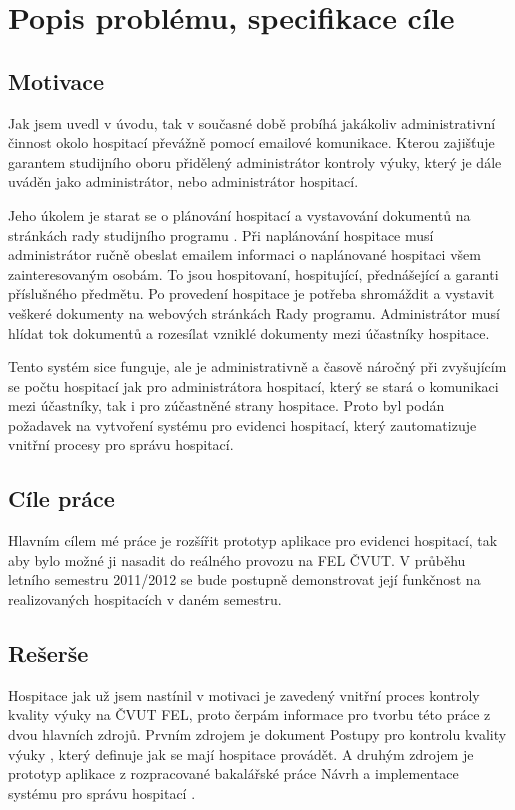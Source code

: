 \chapter{Popis problému, specifikace cíle}
\section{Motivace}
Jak jsem uvedl v úvodu, tak v současné době probíhá jakákoliv administrativní činnost okolo hospitací převážně pomocí emailové komunikace. Kterou zajišťuje garantem studijního oboru přidělený administrátor kontroly výuky, který je dále  uváděn jako administrátor, nebo administrátor hospitací. 

Jeho úkolem je starat se o plánování hospitací a vystavování dokumentů na stránkách rady studijního programu \cite{kvalitavyukyweb}. Při naplánování hospitace musí administrátor ručně obeslat emailem informaci o naplánované hospitaci všem zainteresovaným osobám. To jsou hospitovaní, hospitující, přednášející a garanti příslušného předmětu. Po provedení hospitace je potřeba shromáždit a vystavit veškeré dokumenty na webových stránkách Rady programu. Administrátor musí hlídat tok dokumentů a rozesílat vzniklé dokumenty mezi účastníky hospitace.

Tento systém sice funguje, ale je administrativně a časově náročný při zvyšujícím se počtu hospitací jak pro administrátora hospitací, který se stará o komunikaci mezi účastníky, tak i pro zúčastněné strany hospitace. Proto byl podán požadavek na vytvoření systému pro evidenci hospitací, který zautomatizuje vnitřní procesy pro správu hospitací.

\section{Cíle práce}
Hlavním cílem mé práce je rozšířit prototyp aplikace pro evidenci hospitací, tak aby bylo možné ji nasadit do reálného provozu na FEL ČVUT. V průběhu letního semestru 2011/2012 se bude postupně demonstrovat její funkčnost na realizovaných hospitacích v daném semestru.

\section{Rešerše}
Hospitace jak už jsem nastínil v motivaci je zavedený vnitřní proces kontroly kvality výuky na ČVUT FEL, proto čerpám informace pro tvorbu této práce z dvou hlavních zdrojů. Prvním zdrojem je dokument Postupy pro kontrolu kvality výuky \cite{postupy}, který definuje jak se mají hospitace provádět. A druhým zdrojem je prototyp aplikace z rozpracované bakalářské práce Návrh a implementace systému pro správu hospitací \cite{prototyp_documentace}.

